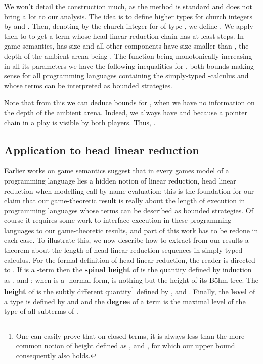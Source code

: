 \documentclass{article}
\begin{document}
We won't detail the construction much, as the method is standard and does not bring a lot to our analysis. The idea is to define higher types for church integers by  and . Then, 
denoting by  the church integer for  of type , we define . We apply then  to  to get a term whose head linear
reduction chain has at least  steps. In game semantics,  has size  and all other components have size smaller than , the depth of the ambient arena being . The function  being
monotonically increasing in all its parameters we have the following inequalities for , both bounds making sense for all programming languages containing the simply-typed -calculus and whose 
terms can be interpreted as bounded strategies.

Note that from this we can deduce bounds for , when we have no information on the depth of the ambient arena. Indeed, we always have  and  because a pointer chain in a play
is visible by both players. Thus, .

\subsection{Application to head linear reduction}

Earlier works on game semantics \cite{danosregnier} suggest that in every games model of a programming language lies a hidden notion of linear reduction, head linear reduction
when modelling call-by-name evaluation: this is the foundation for our claim that our game-theoretic result is really about the length of execution in programming languages whose terms can
be described as bounded strategies. Of course it requires some work to interface execution in these programming languages to our game-theoretic results, and part of this work has to be redone in each case. 
To illustrate this, we now describe how to extract from our results a theorem about the length of head linear reduction sequences in simply-typed -calculus. For the formal definition of head linear reduction, the reader
is directed to \cite{danos:abstract}. If  is a -term then the \textbf{spinal height} of  is the quantity  defined by induction as ,  and ; when  is a -normal form,  is nothing but the height of its Böhm tree.
The \textbf{height} of  is the subtly different quantity\footnote{One can easily prove that on closed terms, it is always less than the more common notion of height defined as
,  and , for which our upper bound consequently also holds.}  defined by ,  and . Finally, the
\textbf{level} of a type  is defined by  and  and the \textbf{degree}  of a term is the maximal level of the type of all subterms
of .
\end{document}
